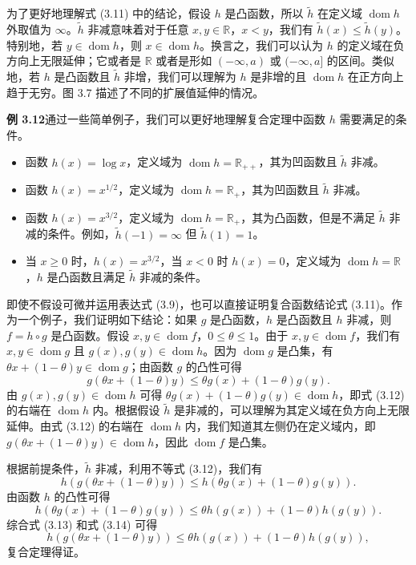 \documentclass[UTF8,12pt,a4paper,fontset=fandol]{ctexart}
\DeclareMathOperator{\dom}{dom}
\begin{document}
为了更好地理解式 (3.11) 中的结论，假设 $h$ 是凸函数，所以 $\tilde h$ 在定义域 $\dom h$ 外取值为 $\infty$。$\tilde h$ 非减意味着对于任意 $x,y\in\mathbb{R}$，$x<y$，我们有 $\tilde h(x)\leq\tilde h(y)$。特别地，若 $y\in\dom h$，则 $x\in\dom h$。换言之，我们可以认为 $h$ 的定义域在负方向上无限延伸；它或者是 $\mathbb{R}$ 或者是形如 $(-\infty,a)$ 或 $(-\infty,a]$ 的区间。类似地，若 $h$ 是凸函数且 $\tilde h$ 非增，我们可以理解为 $h$ 是非增的且 $\dom h$ 在正方向上趋于无穷。图 3.7 描述了不同的扩展值延伸的情况。

\noindent\textbf{例 3.12}\quad 通过一些简单例子，我们可以更好地理解复合定理中函数 $h$ 需要满足的条件。
\begin{itemize}
\item 函数 $h(x)=\log x$，定义域为 $\dom h=\mathbb{R}_{++}$，其为凹函数且 $\tilde h$ 非减。
\item 函数 $h(x)=x^{1/2}$，定义域为 $\dom h=\mathbb{R}_+$，其为凹函数且 $\tilde h$ 非减。
\item 函数 $h(x)=x^{3/2}$，定义域为 $\dom h=\mathbb{R}_+$，其为凸函数，但是不满足 $\tilde h$ 非减的条件。例如，$\tilde h(-1)=\infty$ 但 $\tilde h(1)=1$。
\item 当 $x\geq0$ 时，$h(x)=x^{3/2}$，当 $x<0$ 时 $h(x)=0$，定义域为 $\dom h=\mathbb{R}$，$h$ 是凸函数且满足 $\tilde h$ 非减的条件。
\end{itemize}

即使不假设可微并运用表达式 (3.9)，也可以直接证明复合函数结论式 (3.11)。作为一个例子，我们证明如下结论：如果 $g$ 是凸函数，$h$ 是凸函数且 $h$ 非减，则 $f=h\circ g$ 是凸函数。假设 $x,y\in\dom f$，$0\leq\theta\leq1$。由于 $x,y\in\dom f$，我们有 $x,y\in\dom g$ 且 $g(x),g(y)\in\dom h$。因为 $\dom g$ 是凸集，有 $\theta x+(1-\theta)y\in\dom g$；由函数 $g$ 的凸性可得
\begin{equation}
g(\theta x+(1-\theta)y)\leq \theta g(x)+(1-\theta)g(y).
\tag{3.12}
\end{equation}
由 $g(x),g(y)\in\dom h$ 可得 $\theta g(x)+(1-\theta)g(y)\in\dom h$，即式 (3.12) 的右端在 $\dom h$ 内。根据假设 $\tilde h$ 是非减的，可以理解为其定义域在负方向上无限延伸。由式 (3.12) 的右端在 $\dom h$ 内，我们知道其左侧仍在定义域内，即 $g(\theta x+(1-\theta)y)\in\dom h$，因此 $\dom f$ 是凸集。

根据前提条件，$\tilde h$ 非减，利用不等式 (3.12)，我们有
\begin{equation}
h(g(\theta x+(1-\theta)y))\leq h(\theta g(x)+(1-\theta)g(y)).
\tag{3.13}
\end{equation}
由函数 $h$ 的凸性可得
\begin{equation}
h(\theta g(x)+(1-\theta)g(y))\leq \theta h(g(x))+(1-\theta)h(g(y)).
\tag{3.14}
\end{equation}
综合式 (3.13) 和式 (3.14) 可得
\[
h(g(\theta x+(1-\theta)y))\leq \theta h(g(x))+(1-\theta)h(g(y)),
\]
复合定理得证。
\end{document}
